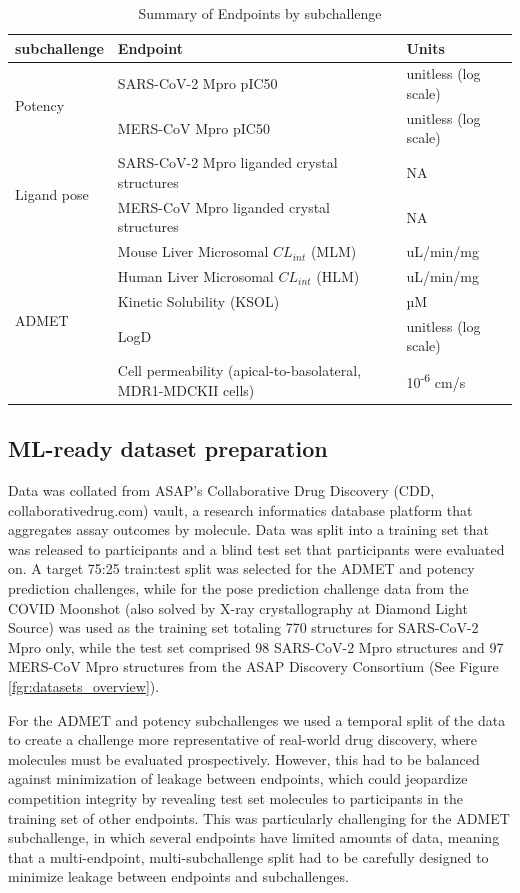 \documentclass[journal=jcim,manuscript=article]{achemso}
\begin{document}
\begin{table}[ht]
\centering
\caption{Summary of Endpoints by subchallenge}
\begin{tabular}{|l|l|l|}
\hline
\textbf{subchallenge} & \textbf{Endpoint} & \textbf{Units} \\
\hline
\multirow{2}{*}{Potency} 
& SARS-CoV-2 Mpro pIC50 & unitless (log scale) \\
& MERS-CoV Mpro pIC50    & unitless (log scale) \\
\hline
\multirow{2}{*}{Ligand pose} 
& SARS-CoV-2 Mpro liganded crystal structures & NA \\
& MERS-CoV Mpro liganded crystal structures   & NA \\
\hline
\multirow{5}{*}{ADMET} 
& Mouse Liver Microsomal $CL_{int}$ (MLM)  & uL/min/mg \\
& Human Liver Microsomal $CL_{int}$ (HLM)  & uL/min/mg \\
& Kinetic Solubility (KSOL)               & µM \\
& LogD                                    & unitless (log scale) \\
& Cell permeability (apical-to-basolateral, MDR1-MDCKII cells) & 10\textsuperscript{-6} cm/s \\
\hline
\end{tabular}
\end{table}

\subsection{ML-ready dataset preparation}

Data was collated from ASAP’s Collaborative Drug Discovery (CDD, collaborativedrug.com) vault, a research informatics database platform that aggregates assay outcomes by molecule. Data was split into a training set that was released to participants and a blind test set that participants were evaluated on. A target 75:25 train:test split was selected for the ADMET and potency prediction challenges, while for the pose prediction challenge data from the COVID Moonshot\cite{boby_2023} (also solved by X-ray crystallography at Diamond Light Source) was used as the training set totaling 770 structures for SARS-CoV-2 Mpro only, while the test set comprised 98 SARS-CoV-2 Mpro structures and 97 MERS-CoV Mpro structures from the ASAP Discovery Consortium (See Figure \ref{fgr:datasets_overview}).  

For the ADMET and potency subchallenges we used a temporal split of the data to create a challenge more representative of real-world drug discovery, where molecules must be evaluated prospectively\cite{sheridan_time-split_2013}. However, this had to be balanced against minimization of leakage between endpoints, which could jeopardize competition integrity by revealing test set molecules to participants in the training set of other endpoints. This was particularly challenging for the ADMET subchallenge, in which several endpoints have limited amounts of data, meaning that a multi-endpoint, multi-subchallenge split had to be carefully designed to minimize leakage between endpoints and subchallenges. 
\end{document}
